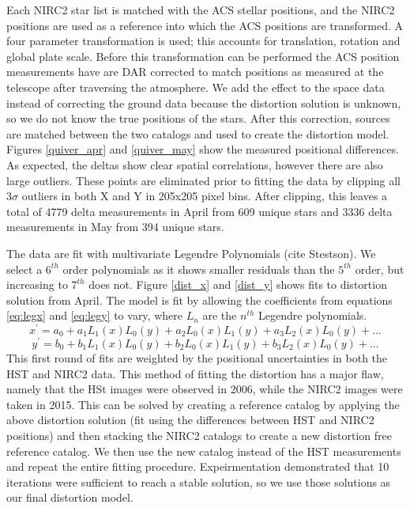 Each NIRC2 star list is matched with the ACS stellar positions, and the NIRC2 positions are used as a reference into which the ACS positions are transformed.  A four parameter transformation is used; this accounts for translation, rotation and global plate scale.  Before this transformation can be performed the ACS position measurements have are DAR corrected to match positions as measured at the telescope after traversing the atmosphere.  We add the effect to the space data instead of correcting the ground data because the distortion solution is unknown, so we do not know the true positions of the stars.  After this correction, sources are matched between the two catalogs and used to create the distortion model.  Figures \ref{quiver_apr} and \ref{quiver_may} show the measured positional differences.  As expected, the deltas show clear spatial correlations, however there are also large outliers.  These points are eliminated prior to fitting the data by clipping all 3$\sigma$ outliers in both X and Y in 205x205 pixel bins.  After clipping, this leaves a total of 4779 delta measurements in April from 609 unique stars and 3336 delta measurements in May from 394 unique stars. 

The data are fit with multivariate Legendre Polynomials (cite Stestson).  We select a $6^{th}$ order polynomials as it shows smaller residuals than the $5^{th}$ order, but increasing to $7^{th}$ does not.  Figure \ref{dist_x} and \ref{dist_y} shows fits to distortion solution from April.  The model is fit by allowing the coefficients from equations \ref{eq:legx} and \ref{eq:legy} to vary, where $L_{n}$ are the $n^{th}$ Legendre polynomials.  
\begin{equation}
x^{'} = a_{0} + a_{1}L_{1}(x)L_{0}(y) +  a_{2}L_{0}(x)L_{1}(y) + a_{3}L_{2}(x)L_{0}(y)+...
\label{eq:legx}
\end{equation}
\begin{equation}
y^{'} = b_{0} + b_{1}L_{1}(x)L_{0}(y) +  b_{2}L_{0}(x)L_{1}(y) + b_{3}L_{2}(x)L_{0}(y)+...
\label{eq:legy}
\end{equation}
This first round of fits are weighted by the positional uncertainties in both the HST and NIRC2 data.  This method of fitting the distortion has a major flaw, namely that the HSt images were observed in 2006, while the NIRC2 images were taken in 2015.   This can be solved by creating a reference catalog by applying the above distortion solution (fit using the differences between HST and NIRC2 positions) and then stacking the NIRC2 catalogs to create a new distortion free reference catalog.  We then use the new catalog instead of the HST measurements and repeat the entire fitting procedure.  Expeirmentation demonstrated that 10 iterations were sufficient to reach a stable solution, so we use those solutions as our final distortion model.  



